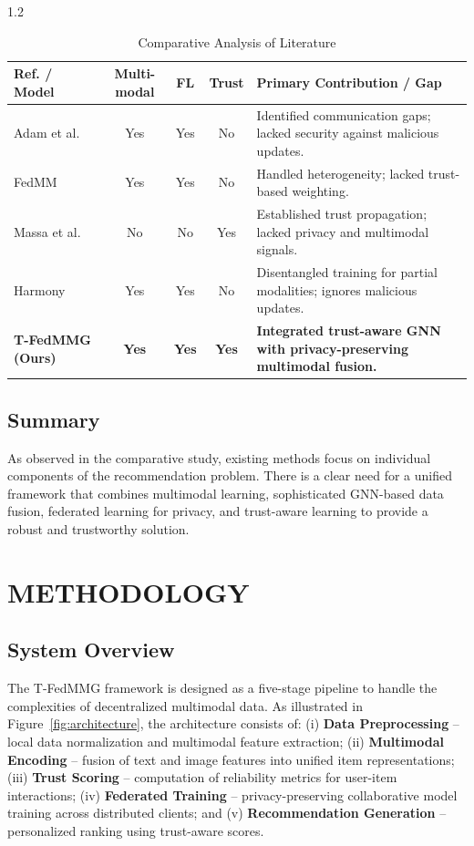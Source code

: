 \documentclass[12pt,a4paper]{report}
\begin{document}
{\begin{table}[htbp]
\centering
\caption{Comparative Analysis of Literature}
\label{tab:literature_comparison}
\begin{spacing}{1.2}
\fontsize{10pt}{12pt}\selectfont
\begin{tabular}{|p{2.5cm}|c|c|c|p{4.5cm}|}
\hline
\textbf{Ref. / Model} & \textbf{Multi-modal} & \textbf{FL} & \textbf{Trust} & \textbf{Primary Contribution / Gap} \\ \hline
Adam et al. & Yes & Yes & No & Identified communication gaps; lacked security against malicious updates. \\ \hline
FedMM & Yes & Yes & No & Handled heterogeneity; lacked trust-based weighting. \\ \hline
Massa et al. & No & No & Yes & Established trust propagation; lacked privacy and multimodal signals. \\ \hline
Harmony & Yes & Yes & No & Disentangled training for partial modalities; ignores malicious updates. \\ \hline
\textbf{T-FedMMG (Ours)} & \textbf{Yes} & \textbf{Yes} & \textbf{Yes} & \textbf{Integrated trust-aware GNN with privacy-preserving multimodal fusion.} \\ \hline
\end{tabular}
\end{spacing}
\end{table}

\section{Summary}
As observed in the comparative study, existing methods focus on individual components of the recommendation problem. There is a clear need for a unified framework that combines multimodal learning, sophisticated GNN-based data fusion, federated learning for privacy, and trust-aware learning to provide a robust and trustworthy solution.

\chapter{METHODOLOGY}

\section{System Overview}
The T-FedMMG framework is designed as a five-stage pipeline to handle the complexities of decentralized multimodal data. As illustrated in Figure~\ref{fig:architecture}, the architecture consists of: (i) \textbf{Data Preprocessing} -- local data normalization and multimodal feature extraction; (ii) \textbf{Multimodal Encoding} -- fusion of text and image features into unified item representations; (iii) \textbf{Trust Scoring} -- computation of reliability metrics for user-item interactions; (iv) \textbf{Federated Training} -- privacy-preserving collaborative model training across distributed clients; and (v) \textbf{Recommendation Generation} -- personalized ranking using trust-aware scores.

}
\end{document}
